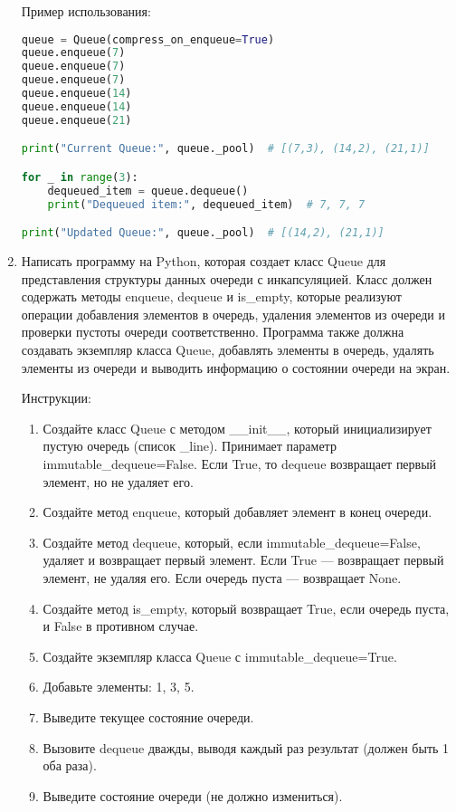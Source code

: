 \begin{enumerate}
Пример использования:
\begin{lstlisting}[language=Python]
queue = Queue(compress_on_enqueue=True)
queue.enqueue(7)
queue.enqueue(7)
queue.enqueue(7)
queue.enqueue(14)
queue.enqueue(14)
queue.enqueue(21)

print("Current Queue:", queue._pool)  # [(7,3), (14,2), (21,1)]

for _ in range(3):
    dequeued_item = queue.dequeue()
    print("Dequeued item:", dequeued_item)  # 7, 7, 7

print("Updated Queue:", queue._pool)  # [(14,2), (21,1)]
\end{lstlisting}

\item Написать программу на Python, которая создает класс Queue для представления структуры данных очереди с инкапсуляцией. Класс должен содержать методы enqueue, dequeue и is\_empty, которые реализуют операции добавления элементов в очередь, удаления элементов из очереди и проверки пустоты очереди соответственно. Программа также должна создавать экземпляр класса Queue, добавлять элементы в очередь, удалять элементы из очереди и выводить информацию о состоянии очереди на экран.

Инструкции:
\begin{enumerate}
    \item Создайте класс Queue с методом \_\_init\_\_, который инициализирует пустую очередь (список \_line). Принимает параметр immutable\_dequeue=False. Если True, то dequeue возвращает первый элемент, но не удаляет его.
    \item Создайте метод enqueue, который добавляет элемент в конец очереди.
    \item Создайте метод dequeue, который, если immutable\_dequeue=False, удаляет и возвращает первый элемент. Если True — возвращает первый элемент, не удаляя его. Если очередь пуста — возвращает None.
    \item Создайте метод is\_empty, который возвращает True, если очередь пуста, и False в противном случае.
    \item Создайте экземпляр класса Queue с immutable\_dequeue=True.
    \item Добавьте элементы: 1, 3, 5.
    \item Выведите текущее состояние очереди.
    \item Вызовите dequeue дважды, выводя каждый раз результат (должен быть 1 оба раза).
    \item Выведите состояние очереди (не должно измениться).
\end{enumerate}


\end{enumerate}
